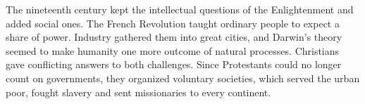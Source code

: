 \begin{partoverview}
The nineteenth century kept the intellectual questions of the Enlightenment and added social ones. The
French Revolution taught ordinary people to expect a share of power. Industry gathered them into great
cities, and Darwin's theory seemed to make humanity one more outcome of natural processes. Christians
gave conflicting answers to both challenges. Since Protestants could no longer count on governments,
they organized voluntary societies, which served the urban poor, fought slavery and sent missionaries
to every continent.
\end{partoverview}
